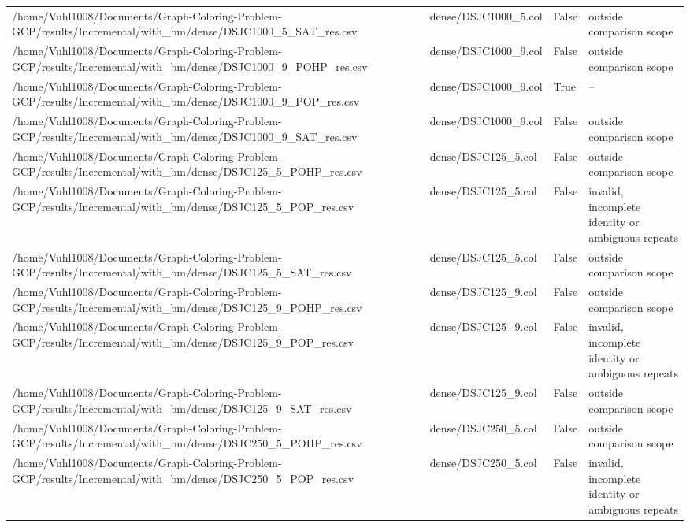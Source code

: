 \begin{table}[htbp]
\begin{tabular}{llll}
/home/Vuhl1008/Documents/Graph-Coloring-Problem-GCP/results/Incremental/with\_bm/dense/DSJC1000\_5\_SAT\_res.csv & dense/DSJC1000\_5.col & False & outside comparison scope \\
/home/Vuhl1008/Documents/Graph-Coloring-Problem-GCP/results/Incremental/with\_bm/dense/DSJC1000\_9\_POHP\_res.csv & dense/DSJC1000\_9.col & False & outside comparison scope \\
/home/Vuhl1008/Documents/Graph-Coloring-Problem-GCP/results/Incremental/with\_bm/dense/DSJC1000\_9\_POP\_res.csv & dense/DSJC1000\_9.col & True & -- \\
/home/Vuhl1008/Documents/Graph-Coloring-Problem-GCP/results/Incremental/with\_bm/dense/DSJC1000\_9\_SAT\_res.csv & dense/DSJC1000\_9.col & False & outside comparison scope \\
/home/Vuhl1008/Documents/Graph-Coloring-Problem-GCP/results/Incremental/with\_bm/dense/DSJC125\_5\_POHP\_res.csv & dense/DSJC125\_5.col & False & outside comparison scope \\
/home/Vuhl1008/Documents/Graph-Coloring-Problem-GCP/results/Incremental/with\_bm/dense/DSJC125\_5\_POP\_res.csv & dense/DSJC125\_5.col & False & invalid, incomplete identity or ambiguous repeats \\
/home/Vuhl1008/Documents/Graph-Coloring-Problem-GCP/results/Incremental/with\_bm/dense/DSJC125\_5\_SAT\_res.csv & dense/DSJC125\_5.col & False & outside comparison scope \\
/home/Vuhl1008/Documents/Graph-Coloring-Problem-GCP/results/Incremental/with\_bm/dense/DSJC125\_9\_POHP\_res.csv & dense/DSJC125\_9.col & False & outside comparison scope \\
/home/Vuhl1008/Documents/Graph-Coloring-Problem-GCP/results/Incremental/with\_bm/dense/DSJC125\_9\_POP\_res.csv & dense/DSJC125\_9.col & False & invalid, incomplete identity or ambiguous repeats \\
/home/Vuhl1008/Documents/Graph-Coloring-Problem-GCP/results/Incremental/with\_bm/dense/DSJC125\_9\_SAT\_res.csv & dense/DSJC125\_9.col & False & outside comparison scope \\
/home/Vuhl1008/Documents/Graph-Coloring-Problem-GCP/results/Incremental/with\_bm/dense/DSJC250\_5\_POHP\_res.csv & dense/DSJC250\_5.col & False & outside comparison scope \\
/home/Vuhl1008/Documents/Graph-Coloring-Problem-GCP/results/Incremental/with\_bm/dense/DSJC250\_5\_POP\_res.csv & dense/DSJC250\_5.col & False & invalid, incomplete identity or ambiguous repeats \\

\end{tabular}
\end{table}
